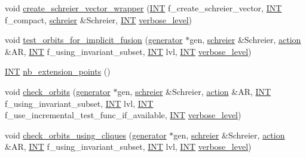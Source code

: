 \begin{DoxyCompactItemize}
\item 
void \mbox{\hyperlink{classoracle_a634e453658cb00c01c6b09fb9e521289}{create\+\_\+schreier\+\_\+vector\+\_\+wrapper}} (\mbox{\hyperlink{galois_8h_a09fddde158a3a20bd2dcadb609de11dc}{I\+NT}} f\+\_\+create\+\_\+schreier\+\_\+vector, \mbox{\hyperlink{galois_8h_a09fddde158a3a20bd2dcadb609de11dc}{I\+NT}} f\+\_\+compact, \mbox{\hyperlink{classschreier}{schreier}} \&Schreier, \mbox{\hyperlink{galois_8h_a09fddde158a3a20bd2dcadb609de11dc}{I\+NT}} \mbox{\hyperlink{simeon_8_c_a818073fbcc2f439e7c56952f67386122}{verbose\+\_\+level}})
\item 
void \mbox{\hyperlink{classoracle_adea7f6e638a119f01b378f4f4786c965}{test\+\_\+orbits\+\_\+for\+\_\+implicit\+\_\+fusion}} (\mbox{\hyperlink{classgenerator}{generator}} $\ast$gen, \mbox{\hyperlink{classschreier}{schreier}} \&Schreier, \mbox{\hyperlink{classaction}{action}} \&AR, \mbox{\hyperlink{galois_8h_a09fddde158a3a20bd2dcadb609de11dc}{I\+NT}} f\+\_\+using\+\_\+invariant\+\_\+subset, \mbox{\hyperlink{galois_8h_a09fddde158a3a20bd2dcadb609de11dc}{I\+NT}} lvl, \mbox{\hyperlink{galois_8h_a09fddde158a3a20bd2dcadb609de11dc}{I\+NT}} \mbox{\hyperlink{simeon_8_c_a818073fbcc2f439e7c56952f67386122}{verbose\+\_\+level}})
\item 
\mbox{\hyperlink{galois_8h_a09fddde158a3a20bd2dcadb609de11dc}{I\+NT}} \mbox{\hyperlink{classoracle_a1a19af59b8be86d6d41cb457ebd3c15b}{nb\+\_\+extension\+\_\+points}} ()
\item 
void \mbox{\hyperlink{classoracle_a7046977fe379fb4218af655634caa958}{check\+\_\+orbits}} (\mbox{\hyperlink{classgenerator}{generator}} $\ast$gen, \mbox{\hyperlink{classschreier}{schreier}} \&Schreier, \mbox{\hyperlink{classaction}{action}} \&AR, \mbox{\hyperlink{galois_8h_a09fddde158a3a20bd2dcadb609de11dc}{I\+NT}} f\+\_\+using\+\_\+invariant\+\_\+subset, \mbox{\hyperlink{galois_8h_a09fddde158a3a20bd2dcadb609de11dc}{I\+NT}} lvl, \mbox{\hyperlink{galois_8h_a09fddde158a3a20bd2dcadb609de11dc}{I\+NT}} f\+\_\+use\+\_\+incremental\+\_\+test\+\_\+func\+\_\+if\+\_\+available, \mbox{\hyperlink{galois_8h_a09fddde158a3a20bd2dcadb609de11dc}{I\+NT}} \mbox{\hyperlink{simeon_8_c_a818073fbcc2f439e7c56952f67386122}{verbose\+\_\+level}})
\item 
void \mbox{\hyperlink{classoracle_ad967fdd884850e9f6e5e343632912446}{check\+\_\+orbits\+\_\+using\+\_\+cliques}} (\mbox{\hyperlink{classgenerator}{generator}} $\ast$gen, \mbox{\hyperlink{classschreier}{schreier}} \&Schreier, \mbox{\hyperlink{classaction}{action}} \&AR, \mbox{\hyperlink{galois_8h_a09fddde158a3a20bd2dcadb609de11dc}{I\+NT}} f\+\_\+using\+\_\+invariant\+\_\+subset, \mbox{\hyperlink{galois_8h_a09fddde158a3a20bd2dcadb609de11dc}{I\+NT}} lvl, \mbox{\hyperlink{galois_8h_a09fddde158a3a20bd2dcadb609de11dc}{I\+NT}} \mbox{\hyperlink{simeon_8_c_a818073fbcc2f439e7c56952f67386122}{verbose\+\_\+level}})

\end{DoxyCompactItemize}

